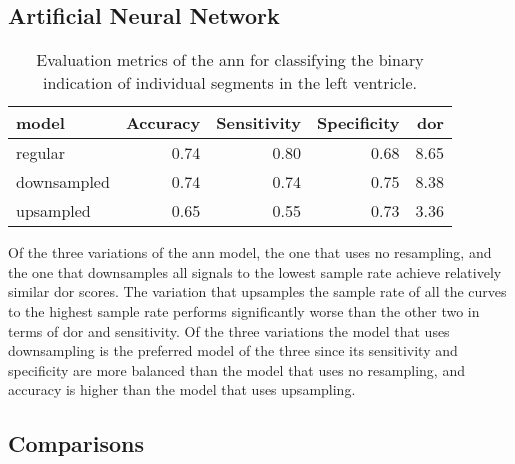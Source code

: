 \newpage

\subsection{Artificial Neural Network}

\begin{table*}[htb]
    \centering
    \begin{tabular}{lrrrr}
        \toprule
        model      &  Accuracy &  Sensitivity &  Specificity &  \acrshort{dor} \\
        \midrule
        regular     &      0.74 &         0.80 &         0.68 & 8.65 \\
        downsampled &      0.74 &         0.74 &         0.75 & 8.38 \\
        upsampled   &      0.65 &         0.55 &         0.73 & 3.36 \\
        \bottomrule
    \end{tabular}
    \caption{Evaluation metrics of the \acrshort{ann} for classifying the binary indication of individual segments in the left ventricle.}
    \label{tab:ANN_segm_ind_perf}
\end{table*}

Of the three variations of the \acrshort{ann} model, the one that uses no resampling, and the one that downsamples all signals to the lowest sample rate achieve relatively similar \acrshort{dor} scores. The variation that upsamples the sample rate of all the curves to the highest sample rate performs significantly worse than the other two in terms of \acrshort{dor} and sensitivity. Of the three variations the model that uses downsampling is the preferred model of the three since its sensitivity and specificity are more balanced than the model that uses no resampling, and accuracy is higher than the model that uses upsampling.

\subsection{Comparisons}

